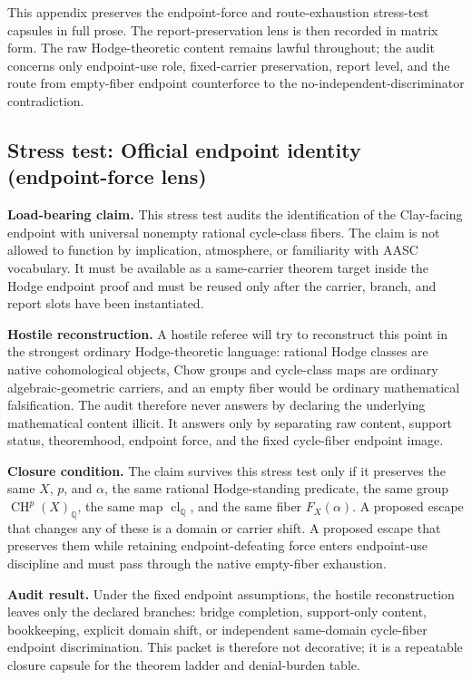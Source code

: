 \documentclass[11pt]{article}
\newcommand{\QQ}{\mathbb{Q}}
\newcommand{\CH}{\operatorname{CH}}
\newcommand{\clQ}{\operatorname{cl}_{\QQ}}
\begin{document}
This appendix preserves the endpoint-force and route-exhaustion stress-test capsules in full prose. The report-preservation lens is then recorded in matrix form. The raw Hodge-theoretic content remains lawful throughout; the audit concerns only endpoint-use role, fixed-carrier preservation, report level, and the route from empty-fiber endpoint counterforce to the no-independent-discriminator contradiction.


\subsection{Stress test: Official endpoint identity (endpoint-force lens)}

\par\noindent\textbf{Load-bearing claim.} This stress test audits the identification of the Clay-facing endpoint with universal nonempty rational cycle-class fibers. The claim is not allowed to function by implication, atmosphere, or familiarity with AASC vocabulary. It must be available as a same-carrier theorem target inside the Hodge endpoint proof and must be reused only after the carrier, branch, and report slots have been instantiated.

\par\noindent\textbf{Hostile reconstruction.} A hostile referee will try to reconstruct this point in the strongest ordinary Hodge-theoretic language: rational Hodge classes are native cohomological objects, Chow groups and cycle-class maps are ordinary algebraic-geometric carriers, and an empty fiber would be ordinary mathematical falsification. The audit therefore never answers by declaring the underlying mathematical content illicit. It answers only by separating raw content, support status, theoremhood, endpoint force, and the fixed cycle-fiber endpoint image.

\par\noindent\textbf{Closure condition.} The claim survives this stress test only if it preserves the same $X$, $p$, and $\alpha$, the same rational Hodge-standing predicate, the same group $\CH^p(X)_\QQ$, the same map $\clQ$, and the same fiber $F_X(\alpha)$. A proposed escape that changes any of these is a domain or carrier shift. A proposed escape that preserves them while retaining endpoint-defeating force enters endpoint-use discipline and must pass through the native empty-fiber exhaustion.

\par\noindent\textbf{Audit result.} Under the fixed endpoint assumptions, the hostile reconstruction leaves only the declared branches: bridge completion, support-only content, bookkeeping, explicit domain shift, or independent same-domain cycle-fiber endpoint discrimination. This packet is therefore not decorative; it is a repeatable closure capsule for the theorem ladder and denial-burden table.
\end{document}
